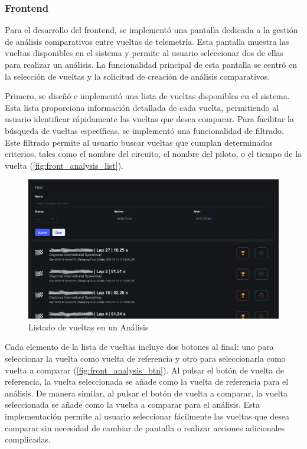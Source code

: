 \subsubsection*{Frontend}

Para el desarrollo del frontend, se implementó una pantalla dedicada a la gestión de análisis comparativos entre vueltas de telemetría. Esta pantalla muestra las vueltas disponibles en el sistema y permite al usuario seleccionar dos de ellas para realizar un análisis. La funcionalidad principal de esta pantalla se centró en la selección de vueltas y la solicitud de creación de análisis comparativos.

Primero, se diseñó e implementó una lista de vueltas disponibles en el sistema. Esta lista proporciona información detallada de cada vuelta, permitiendo al usuario identificar rápidamente las vueltas que desea comparar. Para facilitar la búsqueda de vueltas específicas, se implementó una funcionalidad de filtrado. Este filtrado permite al usuario buscar vueltas que cumplan determinados criterios, tales como el nombre del circuito, el nombre del piloto, o el tiempo de la vuelta (\autoref{fig:front_analysis_list}).

\begin{figure}[H]
\centering
\includegraphics[width=0.6\linewidth]{./figs/herramientas/desarrollo/front_analysis_list.png}
\caption[Listado de vueltas en un Análisis]{Listado de vueltas en un Análisis}
\label{fig:front_analysis_list}
\end{figure}

Cada elemento de la lista de vueltas incluye dos botones al final: uno para seleccionar la vuelta como vuelta de referencia y otro para seleccionarla como vuelta a comparar (\autoref{fig:front_analysis_btn}). Al pulsar el botón de vuelta de referencia, la vuelta seleccionada se añade como la vuelta de referencia para el análisis. De manera similar, al pulsar el botón de vuelta a comparar, la vuelta seleccionada se añade como la vuelta a comparar para el análisis. Esta implementación permite al usuario seleccionar fácilmente las vueltas que desea comparar sin necesidad de cambiar de pantalla o realizar acciones adicionales complicadas.

